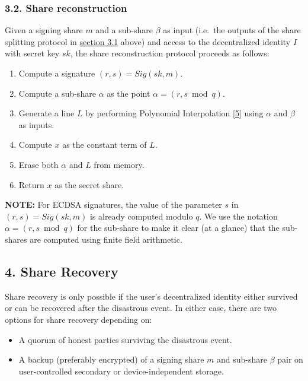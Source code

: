 \documentclass[
]{article}
\providecommand{\tightlist}{%
  \setlength{\itemsep}{0pt}\setlength{\parskip}{0pt}}
\begin{document}
\hypertarget{share-reconstruction}{%
\subsubsection{3.2. Share reconstruction}\label{share-reconstruction}}

Given a signing share \(m\) and a sub-share \(\beta\) as input (i.e.~the
outputs of the share splitting protocol in
\protect\hyperlink{share-splitting}{section 3.1} above) and access to
the decentralized identity \(I\) with secret key \(sk\), the share
reconstruction protocol proceeds as follows:

\begin{enumerate}
\def\labelenumi{\arabic{enumi}.}
\tightlist
\item
  Compute a signature \((r, s) = Sig(sk, m)\).
\item
  Compute a sub-share \(\alpha\) as the point
  \(\alpha = (r, s \bmod q)\).
\item
  Generate a line \(L\) by performing Polynomial Interpolation
  {[}\protect\hyperlink{ref-wiki:interpolation}{5}{]} using \(\alpha\)
  and \(\beta\) as inputs.
\item
  Compute \(x\) as the constant term of \(L\).
\item
  Erase both \(\alpha\) and \(L\) from memory.
\item
  Return \(x\) as the secret share.
\end{enumerate}

\textbf{NOTE:} For ECDSA signatures, the value of the parameter \(s\) in
\((r, s) = Sig(sk, m)\) is already computed modulo \(q\). We use the
notation \(\alpha = (r, s \bmod q)\) for the sub-share to make it clear
(at a glance) that the sub-shares are computed using finite field
arithmetic.

\hypertarget{share-recovery}{%
\subsection{4. Share Recovery}\label{share-recovery}}

Share recovery is only possible if the user's decentralized identity
either survived or can be recovered after the disastrous event. In
either case, there are two options for share recovery depending on:

\begin{itemize}
\tightlist
\item
  A quorum of honest parties surviving the disastrous event.
\item
  A backup (preferably encrypted) of a signing share \(m\) and sub-share
  \(\beta\) pair on user-controlled secondary or device-independent
  storage.
\end{itemize}
\end{document}
